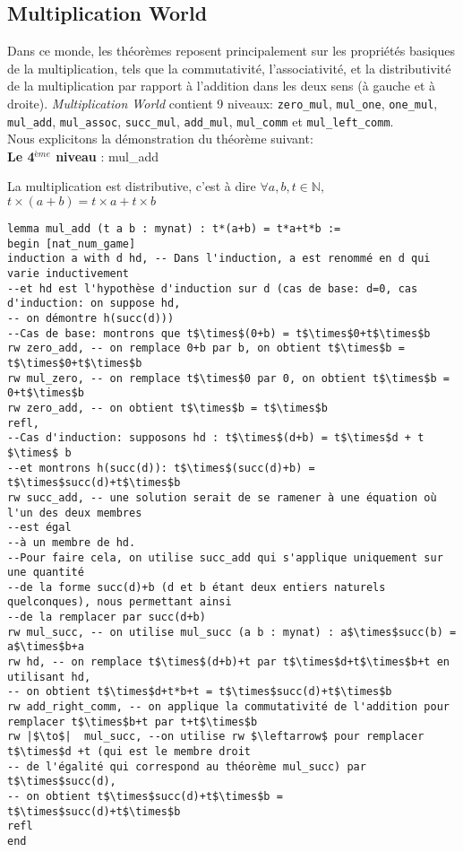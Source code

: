 \subsection{Multiplication World}
Dans ce monde, les théorèmes reposent principalement sur les propriétés basiques de la multiplication, tels que la commutativité, l'associativité, et la distributivité de la multiplication par rapport à l'addition dans les deux sens (à gauche et à droite). \textit{Multiplication World} contient 9 niveaux: \texttt{zero\_mul}, \texttt{mul\_one}, \texttt{one\_mul}, \texttt{mul\_add}, \texttt{mul\_assoc}, \texttt{succ\_mul}, \texttt{add\_mul}, \texttt{mul\_comm} et \texttt{mul\_left\_comm}.\\ Nous explicitons la démonstration du théorème suivant: \\
\textbf{Le 4$^{ème}$ niveau} :  mul\_add  \begin{center} La multiplication est distributive, c'est à dire  $\forall a, b, t \in \mathbb{N},$  $t\times(a+b)=t\times a+t\times b $ \end{center}
\begin{verbatim}
lemma mul_add (t a b : mynat) : t*(a+b) = t*a+t*b :=
begin [nat_num_game]
induction a with d hd, -- Dans l'induction, a est renommé en d qui varie inductivement 
--et hd est l'hypothèse d'induction sur d (cas de base: d=0, cas d'induction: on suppose hd, 
-- on démontre h(succ(d)))   
--Cas de base: montrons que t$\times$(0+b) = t$\times$0+t$\times$b
rw zero_add, -- on remplace 0+b par b, on obtient t$\times$b = t$\times$0+t$\times$b 
rw mul_zero, -- on remplace t$\times$0 par 0, on obtient t$\times$b = 0+t$\times$b 
rw zero_add, -- on obtient t$\times$b = t$\times$b
refl,
--Cas d'induction: supposons hd : t$\times$(d+b) = t$\times$d + t $\times$ b
--et montrons h(succ(d)): t$\times$(succ(d)+b) = t$\times$succ(d)+t$\times$b 
rw succ_add, -- une solution serait de se ramener à une équation où l'un des deux membres 
--est égal 
--à un membre de hd. 
--Pour faire cela, on utilise succ_add qui s'applique uniquement sur une quantité 
--de la forme succ(d)+b (d et b étant deux entiers naturels quelconques), nous permettant ainsi 
--de la remplacer par succ(d+b)
rw mul_succ, -- on utilise mul_succ (a b : mynat) : a$\times$succ(b) = a$\times$b+a
rw hd, -- on remplace t$\times$(d+b)+t par t$\times$d+t$\times$b+t en utilisant hd, 
-- on obtient t$\times$d+t*b+t = t$\times$succ(d)+t$\times$b
rw add_right_comm, -- on applique la commutativité de l'addition pour remplacer t$\times$b+t par t+t$\times$b
rw |$\to$|  mul_succ, --on utilise rw $\leftarrow$ pour remplacer t$\times$d +t (qui est le membre droit
-- de l'égalité qui correspond au théorème mul_succ) par t$\times$succ(d), 
-- on obtient t$\times$succ(d)+t$\times$b = t$\times$succ(d)+t$\times$b
refl
end
\end{verbatim}

